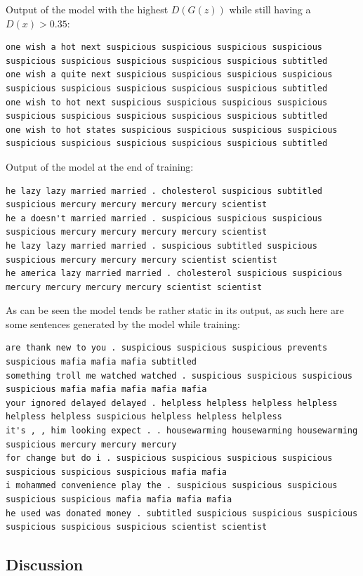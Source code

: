\documentclass{article}
\begin{document}
Output of the model with the highest $D(G(z))$ while still having a $D(x) > 0.35$:
\scriptsize
\begin{verbatim}
one wish a hot next suspicious suspicious suspicious suspicious suspicious suspicious suspicious suspicious suspicious subtitled
one wish a quite next suspicious suspicious suspicious suspicious suspicious suspicious suspicious suspicious suspicious subtitled
one wish to hot next suspicious suspicious suspicious suspicious suspicious suspicious suspicious suspicious suspicious subtitled
one wish to hot states suspicious suspicious suspicious suspicious suspicious suspicious suspicious suspicious suspicious subtitled
\end{verbatim}
\normalsize

Output of the model at the end of training:
\footnotesize
\begin{verbatim}
he lazy lazy married married . cholesterol suspicious subtitled suspicious mercury mercury mercury mercury scientist
he a doesn't married married . suspicious suspicious suspicious suspicious mercury mercury mercury mercury scientist
he lazy lazy married married . suspicious subtitled suspicious suspicious mercury mercury mercury scientist scientist
he america lazy married married . cholesterol suspicious suspicious mercury mercury mercury mercury scientist scientist
\end{verbatim}
\normalsize

As can be seen the model tends be rather static in its output, as such here are some sentences generated by the model while training:
\footnotesize
\begin{verbatim}
are thank new to you . suspicious suspicious suspicious prevents suspicious mafia mafia mafia subtitled
something troll me watched watched . suspicious suspicious suspicious suspicious mafia mafia mafia mafia mafia
your ignored delayed delayed . helpless helpless helpless helpless helpless helpless suspicious helpless helpless helpless
it's , , him looking expect . . housewarming housewarming housewarming suspicious mercury mercury mercury
for change but do i . suspicious suspicious suspicious suspicious suspicious suspicious suspicious mafia mafia
i mohammed convenience play the . suspicious suspicious suspicious suspicious suspicious mafia mafia mafia mafia
he used was donated money . subtitled suspicious suspicious suspicious suspicious suspicious suspicious scientist scientist
\end{verbatim}
\normalsize

\subsection{Discussion}\label{sec:discussion}
\end{document}
